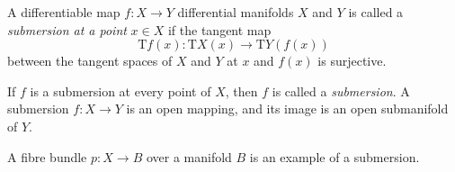 \documentclass[12pt]{article}
\begin{document}
A differentiable map $f\colon X\to Y$  differential manifolds $X$ and $Y$ is called a \emph{submersion at a point} $x\in X$ if the tangent map
$$
\mathrm{T}f(x)\colon\mathrm{T}X(x)\to\mathrm{T}Y(f(x))
$$
between the tangent spaces of $X$ and $Y$ at $x$ and $f(x)$ is surjective.

If $f$ is a submersion at every point of $X$, then $f$ is called a \emph{submersion}.  A submersion $f\colon X\to Y$ is an open mapping, and its image is an open submanifold of $Y$.

A fibre bundle $p\colon X\to B$ over a manifold $B$ is an example of a submersion.
\end{document}
